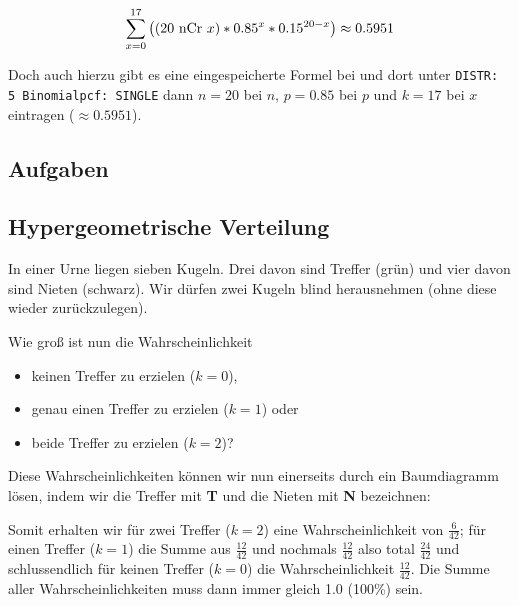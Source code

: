 $$\sum_{x=0}^{17}\left(( 20 \textrm{\,\,nCr\,\,} x ) * 0.85^x *
0.15^{20-x}\right) \approx 0.5951$$


Doch auch hierzu gibt es eine eingespeicherte Formel
bei
 und dort unter \texttt{DISTR: 5
  Binomialpcf: SINGLE} dann $n=20$ bei $n$, $p=0.85$ bei $p$ und
$k=17$ bei $x$ eintragen ($\approx 0.5951$).



\subsection*{Aufgaben}

\newpage



\subsection{Hypergeometrische Verteilung}
In einer Urne liegen sieben Kugeln. Drei davon sind Treffer (grün) und vier davon sind Nieten (schwarz).
Wir dürfen zwei Kugeln blind herausnehmen (ohne diese wieder zurückzulegen).


Wie groß ist nun die Wahrscheinlichkeit
\begin{itemize}
\item keinen Treffer zu erzielen ($k=0$),
\item genau einen Treffer zu erzielen ($k=1$) oder
\item beide Treffer zu erzielen ($k=2$)?
\end{itemize}

Diese Wahrscheinlichkeiten können wir nun einerseits durch ein Baumdiagramm lösen, indem wir die Treffer mit \textbf{\color{green}T} und die Nieten mit \textbf{\color{red}N} bezeichnen:


Somit erhalten wir für zwei Treffer ($k=2$) eine Wahrscheinlichkeit von $\frac{6}{42}$; für einen Treffer ($k=1$) die Summe aus $\frac{12}{42}$ und nochmals $\frac{12}{42}$ also total $\frac{24}{42}$ und schlussendlich für keinen Treffer ($k=0$) die Wahrscheinlichkeit $\frac{12}{42}$.
Die Summe aller Wahrscheinlichkeiten muss dann immer gleich 1.0 (100\%) sein.
\newpage



